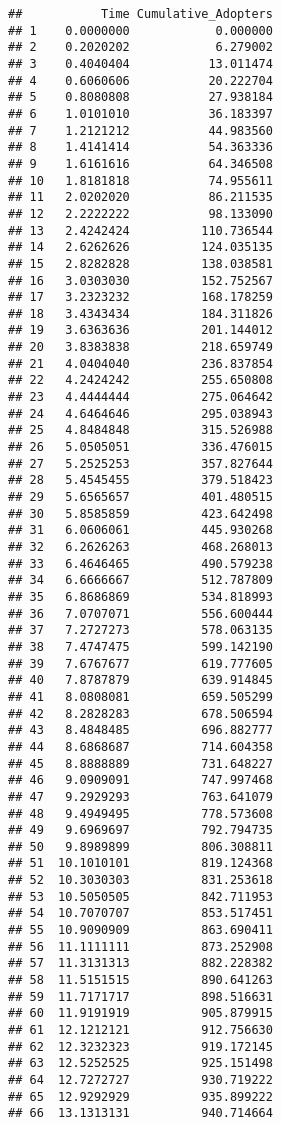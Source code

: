 \documentclass[
]{article}
\begin{document}
\begin{verbatim}
##           Time Cumulative_Adopters
## 1    0.0000000            0.000000
## 2    0.2020202            6.279002
## 3    0.4040404           13.011474
## 4    0.6060606           20.222704
## 5    0.8080808           27.938184
## 6    1.0101010           36.183397
## 7    1.2121212           44.983560
## 8    1.4141414           54.363336
## 9    1.6161616           64.346508
## 10   1.8181818           74.955611
## 11   2.0202020           86.211535
## 12   2.2222222           98.133090
## 13   2.4242424          110.736544
## 14   2.6262626          124.035135
## 15   2.8282828          138.038581
## 16   3.0303030          152.752567
## 17   3.2323232          168.178259
## 18   3.4343434          184.311826
## 19   3.6363636          201.144012
## 20   3.8383838          218.659749
## 21   4.0404040          236.837854
## 22   4.2424242          255.650808
## 23   4.4444444          275.064642
## 24   4.6464646          295.038943
## 25   4.8484848          315.526988
## 26   5.0505051          336.476015
## 27   5.2525253          357.827644
## 28   5.4545455          379.518423
## 29   5.6565657          401.480515
## 30   5.8585859          423.642498
## 31   6.0606061          445.930268
## 32   6.2626263          468.268013
## 33   6.4646465          490.579238
## 34   6.6666667          512.787809
## 35   6.8686869          534.818993
## 36   7.0707071          556.600444
## 37   7.2727273          578.063135
## 38   7.4747475          599.142190
## 39   7.6767677          619.777605
## 40   7.8787879          639.914845
## 41   8.0808081          659.505299
## 42   8.2828283          678.506594
## 43   8.4848485          696.882777
## 44   8.6868687          714.604358
## 45   8.8888889          731.648227
## 46   9.0909091          747.997468
## 47   9.2929293          763.641079
## 48   9.4949495          778.573608
## 49   9.6969697          792.794735
## 50   9.8989899          806.308811
## 51  10.1010101          819.124368
## 52  10.3030303          831.253618
## 53  10.5050505          842.711953
## 54  10.7070707          853.517451
## 55  10.9090909          863.690411
## 56  11.1111111          873.252908
## 57  11.3131313          882.228382
## 58  11.5151515          890.641263
## 59  11.7171717          898.516631
## 60  11.9191919          905.879915
## 61  12.1212121          912.756630
## 62  12.3232323          919.172145
## 63  12.5252525          925.151498
## 64  12.7272727          930.719222
## 65  12.9292929          935.899222
## 66  13.1313131          940.714664

\end{verbatim}
\end{document}
